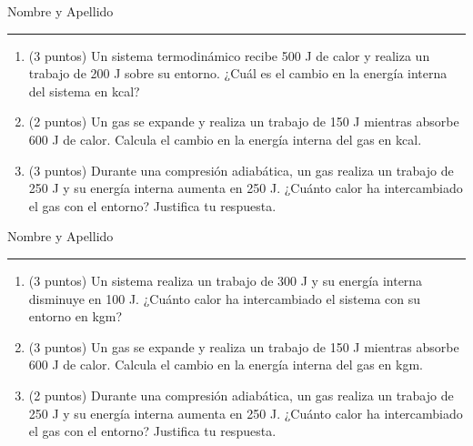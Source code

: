 \documentclass[12pt]{article}
\begin{document}
Nombre y Apellido \rule{10cm}{0.4pt}

\begin{enumerate}
    \item (3 puntos) Un sistema termodinámico recibe 500 J de calor y realiza un trabajo de 200 J sobre su entorno. ¿Cuál es el cambio en la energía interna del sistema en kcal?

    \item (2 puntos) Un gas se expande y realiza un trabajo de 150 J mientras absorbe 600 J de calor. Calcula el cambio en la energía interna del gas en kcal.

  \item (3 puntos) Durante una compresión adiabática, un gas realiza un trabajo de 250 J y su energía interna aumenta en 250 J. ¿Cuánto calor ha intercambiado el gas con el entorno? Justifica tu respuesta.

\end{enumerate}

Nombre y Apellido \rule{10cm}{0.4pt}

\begin{enumerate}

    \item (3 puntos) Un sistema realiza un trabajo de 300 J y su energía interna disminuye en 100 J. ¿Cuánto calor ha intercambiado el sistema con su entorno en kgm?

    \item (3 puntos) Un gas se expande y realiza un trabajo de 150 J mientras absorbe 600 J de calor. Calcula el cambio en la energía interna del gas en kgm.

    \item (2 puntos) Durante una compresión adiabática, un gas realiza un trabajo de 250 J y su energía interna aumenta en 250 J. ¿Cuánto calor ha intercambiado el gas con el entorno? Justifica tu respuesta.

\end{enumerate}
\end{document}
